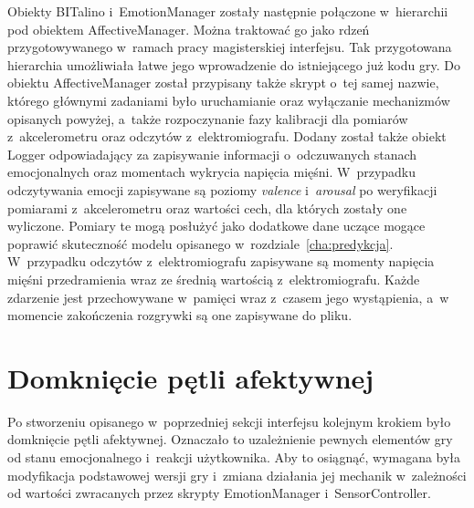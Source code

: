 Obiekty BITalino i~EmotionManager zostały następnie połączone w~hierarchii pod obiektem AffectiveManager. Można traktować go jako rdzeń przygotowywanego w~ramach pracy magisterskiej interfejsu. Tak przygotowana hierarchia umożliwiała łatwe jego wprowadzenie do istniejącego już kodu gry. Do obiektu AffectiveManager został przypisany także skrypt o~tej samej nazwie, którego głównymi zadaniami było uruchamianie oraz wyłączanie mechanizmów opisanych powyżej, a~także rozpoczynanie fazy kalibracji dla pomiarów z~akcelerometru oraz odczytów z~elektromiografu. Dodany został także obiekt Logger odpowiadający za zapisywanie informacji o~odczuwanych stanach emocjonalnych oraz momentach wykrycia napięcia mięśni. W~przypadku odczytywania emocji zapisywane są poziomy \textit{valence} i~\textit{arousal} po weryfikacji pomiarami z~akcelerometru oraz wartości cech, dla których zostały one wyliczone. Pomiary te mogą posłużyć jako dodatkowe dane uczące mogące poprawić skuteczność modelu opisanego w~rozdziale~\ref{cha:predykcja}. W~przypadku odczytów z~elektromiografu zapisywane są momenty napięcia mięśni przedramienia wraz ze średnią wartością z~elektromiografu. Każde zdarzenie jest przechowywane w~pamięci wraz z~czasem jego wystąpienia, a~w momencie zakończenia rozgrywki są one zapisywane do pliku.

\section{Domknięcie pętli afektywnej}
Po stworzeniu opisanego w~poprzedniej sekcji interfejsu kolejnym krokiem było domknięcie pętli afektywnej. Oznaczało to uzależnienie pewnych elementów gry od stanu emocjonalnego i~reakcji użytkownika. Aby to osiągnąć, wymagana była modyfikacja podstawowej wersji gry i~zmiana działania jej mechanik w~zależności od wartości zwracanych przez skrypty EmotionManager i~SensorController.


